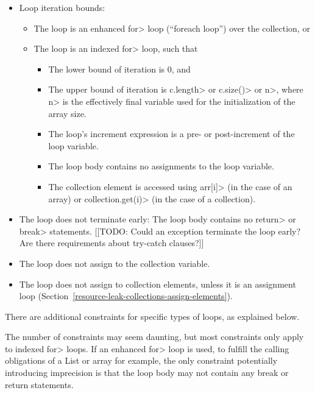 \begin{itemize}
\item Loop iteration bounds:
  \begin{itemize}
  \item
    The loop is an enhanced \<for> loop (``foreach loop'') over the collection, or
  \item
    The loop is an indexed \<for> loop, such that
    \begin{itemize}
    \item The lower bound of iteration is 0, and
    \item The upper bound of iteration is \<c.length> or \<c.size()> or \<n>,
      where \<n> is the effectively final variable used for the initialization of
      the array size.
    \item The loop's increment expression is a pre- or post-increment of the
            loop variable.
    \item The loop body contains no assignments to the loop variable.
    \item The collection element is accessed using \<arr[i]> (in the case of an array) or \<collection.get(i)> (in the case of a collection).
    \end{itemize}
  \end{itemize}
\item The loop does not terminate early: The loop body contains no
  \<return> or \<break> statements. [[TODO: Could an exception terminate
  the loop early?  Are there requirements about try-catch clauses?]]
\item The loop does not assign to the collection variable.
\item The loop does not assign to collection elements, unless it is an
  assignment loop (Section~\ref{resource-leak-collections-assign-elements}).
\end{itemize}

\noindent There are additional constraints for specific types of loops, as
explained below.

The number of constraints may seem daunting, but most constraints only apply to indexed \<for> loops. If an enhanced \<for> loop is used, to fulfill the calling obligations of a List or array for example, the only constraint potentially introducing imprecision is that the loop body may not contain any break or return statements.


